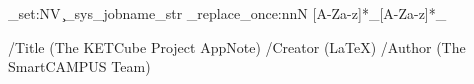 

\ExplSyntaxOn
\tl_set:NV \NUMBER \c_sys_jobname_str
\regex_replace_once:nnN { [A-Za-z]*_[A-Za-z]*_ } { } \NUMBER
\ExplSyntaxOff

\graphicspath{{resources/images/}{resources/appNotes/\NUMBER/images/}}
\graphicspath{{resources/images/}{resources/appNotes/003/images/}}

\pdfinfo
{
  /Title       (The KETCube Project AppNote)
  /Creator     (LaTeX)
  /Author      (The SmartCAMPUS Team)
}


